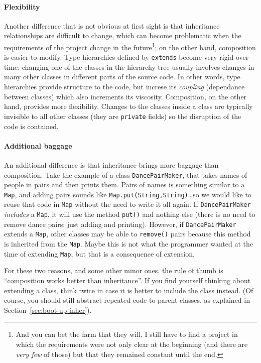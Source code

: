 \paragraph{Flexibility }
\label{sec:flexibility-}

Another difference that is not obvious at first sight is that 
inheritance relationships are difficult to change, which can 
become problematic when the requirements
of the project change in the future\footnote{And you can bet the farm
  that they will. I still have to find a project in which the
  requirements were not only clear at the beginning (and there are
  \emph{very few} of those) but that they remained constant until the end.}; 
on the other hand, composition is
easier to modify. Type hierarchies defined by \verb+extends+ become
very rigid over time: changing one of the classes in the hierarchy
tree usually involves changes in many other classes in different parts
of the source code. In other words, type hierarchies provide structure
to the code, but increse its \emph{coupling} (dependance between classes) 
which also increments its viscosity. Composition, on
the other hand, provides more flexibility. Changes to the classes
inside a class are typically invisible to all other classes (they are
\verb+private+ fields) so the disruption of the code is contained. 

\paragraph{Additional baggage}
\label{sec:additional-baggage}

An additional difference is that inheritance brings more baggage than
composition. Take the example of a class \verb+DancePairMaker+, that
takes names of people in pairs and then prints them. Pairs of names
is something similar to a \verb+Map+, and adding pairs sounds like
\verb+Map.put(String,String)+\ldots so we would like to reuse that
code in \verb+Map+ without the need to write it all again. 
If \verb+DancePairMaker+ \emph{includes} a
\verb+Map+, it will use the method \verb+put()+ and nothing
else (there is no need to remove dance pairs: just adding and
printing). 
However, if \verb+DancePairMaker+ extends a \verb+Map+, other
classes may be able to \verb+remove()+ pairs because this method is
inherited from the \verb+Map+. 
Maybe this is not what the programmer wanted at the time of extending
\verb+Map+, but that is a consequence of extension. 

For these two reasons, and some other minor ones, the rule of thumb is
``composition works better than inheritance''. If you find yourself
thinking about extending a class, think twice in case it is better to
include the class instead. (Of course,
you should still abstract repeated code to parent classes, as
explained in Section~\ref{sec:boot-up-inher}).





